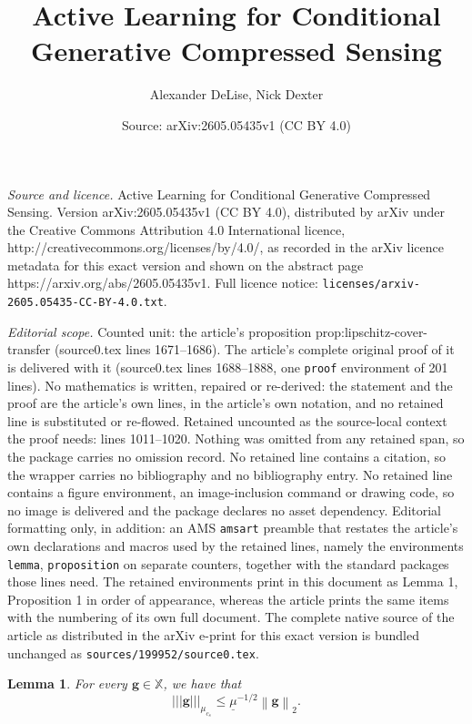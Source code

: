 \documentclass[10pt,a4paper]{amsart}
\title{Active Learning for Conditional Generative Compressed Sensing}
\author{Alexander DeLise, Nick Dexter}
\date{Source: arXiv:2605.05435v1 (CC BY 4.0)}
\newtheorem{lemma}{Lemma}
\newcommand*{\snorm}[2]{\left\vert\!\left\vert\!\left\vert #1 \right\vert\!\right\vert\!\right\vert_{#2}}
\begin{document}
\maketitle

\noindent\emph{Source and licence.} Active Learning for Conditional Generative Compressed Sensing. Version arXiv:2605.05435v1 (CC BY 4.0), distributed by arXiv under the Creative Commons Attribution 4.0 International licence, http://creativecommons.org/licenses/by/4.0/, as recorded in the arXiv licence metadata for this exact version and shown on the abstract page https://arxiv.org/abs/2605.05435v1. Full licence notice: \texttt{licenses/arxiv-2605.05435-CC-BY-4.0.txt}.\par\smallskip

\noindent\textit{Editorial scope.} Counted unit: the article's proposition prop:lipschitz-cover-transfer (source0.tex lines 1671--1686). The article's complete original proof of it is delivered with it (source0.tex lines 1688--1888, one \texttt{proof} environment of 201 lines). No mathematics is written, repaired or re-derived: the statement and the proof are the article's own lines, in the article's own notation, and no retained line is substituted or re-flowed.  Retained uncounted as the source-local context the proof needs: lines 1011--1020.  Nothing was omitted from any retained span, so the package carries no omission record.  No retained line contains a citation, so the wrapper carries no bibliography and no bibliography entry.  No retained line contains a figure environment, an image-inclusion command or drawing code, so no image is delivered and the package declares no asset dependency.  Editorial formatting only, in addition: an AMS \texttt{amsart} preamble that restates the article's own declarations and macros used by the retained lines, namely the environments \texttt{lemma}, \texttt{proposition} on separate counters, together with the standard packages those lines need.  The retained environments print in this document as Lemma 1, Proposition 1 in order of appearance, whereas the article prints the same items with the numbering of its own full document.  The complete native source of the article as distributed in the arXiv e-print for this exact version is bundled unchanged as \texttt{sources/199952/source0.tex}.
\begin{lemma}
    \label{lem:active-support-seminorm-comparison}
  For every $\mathbf g\in \mathbb X$, we have that
  \[
    \snorm{\mathbf g}{\mu_{c_s}}
    \leq
    \underline{\mu}^{-1/2}
    \left\|\mathbf g\right\|_2.
  \]
\end{lemma}
\end{document}

